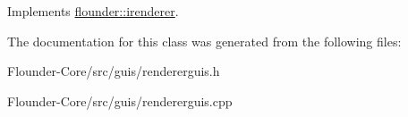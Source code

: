 Implements \hyperlink{classflounder_1_1irenderer_a3f355dc39e2680bf3f3441d3dfaaa010}{flounder\+::irenderer}.



The documentation for this class was generated from the following files\+:\begin{DoxyCompactItemize}
\item 
Flounder-\/\+Core/src/guis/rendererguis.\+h\item 
Flounder-\/\+Core/src/guis/rendererguis.\+cpp\end{DoxyCompactItemize}
